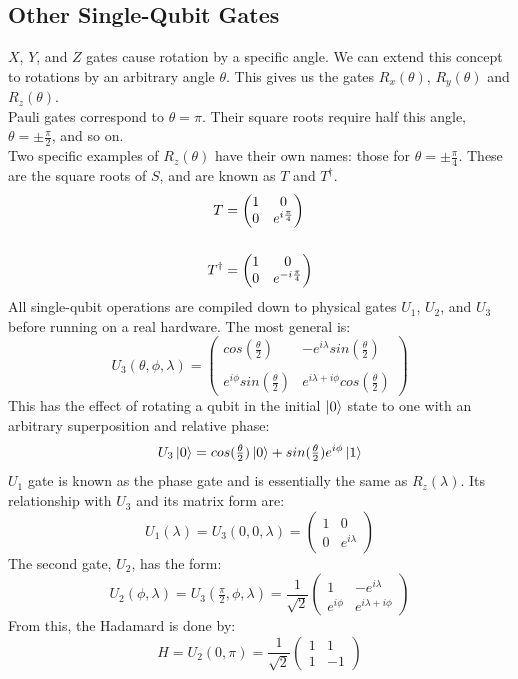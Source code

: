 \documentclass[hidelinks, a4paper, 12pt]{article}
\newcommand{\n}{\\[\baselineskip]}
\begin{document}
        \subsection{Other Single-Qubit Gates}
            $X$, $Y$, and $Z$ gates cause rotation by a specific angle. We can extend this concept to rotations by an arbitrary angle $\theta$. This gives us the gates
            $R_x(\theta)$, $R_y(\theta)$ and $R_z(\theta)$.\n
            Pauli gates correspond to $\theta = \pi$. Their square roots require half this angle, $\theta = \pm \frac{\pi}{2}$, and so on.\n
            Two specific examples of $R_z(\theta)$ have their own names: those for $\theta = \pm \frac{\pi}{4}$. These are the square roots of $S$, and are known as $T$ and $T^\dagger$.
            \[\begin{split}
                T &= \begin{pmatrix} 1 & 0 \\ 0 & e^{i\frac{\pi}{4}} \end{pmatrix}\n
                T^\dagger &= \begin{pmatrix} 1 & 0 \\ 0 & e^{-i\frac{\pi}{4}} \end{pmatrix}
            \end{split}\]
            All single-qubit operations are compiled down to physical gates $U_1$, $U_2$, and $U_3$ before running on a real hardware. The most general is:
            \[U_3(\theta, \phi, \lambda) = \begin{pmatrix} cos(\frac{\theta}{2}) & -e^{i\lambda}sin(\frac{\theta}{2}) \\ \\  e^{i\phi}sin(\frac{\theta}{2}) & e^{i\lambda + i\phi}cos(\frac{\theta}{2}) \end{pmatrix}\]
            This has the effect of rotating a qubit in the initial $\ket{0}$ state to one with an arbitrary superposition and relative phase:
            \[U_3\ket{0} = cos(\tfrac{\theta}{2})\ket{0} + sin(\tfrac{\theta}{2})e^{i\phi}\ket{1}\]
            $U_1$ gate is known as the phase gate and is essentially the same as $R_z(\lambda)$. Its relationship with $U_3$ and its matrix form are:
            \[U_1(\lambda) = U_3(0,0,\lambda) = \begin{pmatrix} 1 & 0 \\ 0 & e^{i\lambda} \end{pmatrix}\]
            The second gate, $U_2$, has the form:
            \[U_2(\phi, \lambda) = U_3(\tfrac{\pi}{2}, \phi, \lambda) = \frac{1}{\sqrt{2}} \begin{pmatrix} 1 & -e^{i\lambda} \\ e^{i\phi} & e^{i\lambda + i\phi} \end{pmatrix}\]
            From this, the Hadamard is done by:
            \[H = U_2(0, \pi) = \frac{1}{\sqrt{2}} \begin{pmatrix} 1 & 1 \\ 1 & -1 \end{pmatrix}\]
\end{document}
